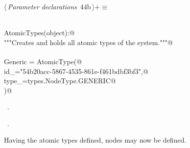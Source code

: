 \documentclass[
    a4paper,      %
    10pt,         %
    openright,    %
    notitlepage,  %
    parskip=half, %
]{scrreprt}       %
\theoremstyle{definition}                    %
\begin{document}
\begin{flushleft} \small
\begin{minipage}{\linewidth}\label{scrap56}\raggedright\small
{} $\langle\,${\itshape Parameter declarations}\nobreak\ {\footnotesize {44b}}$\,\rangle+\equiv$
\vspace{-1ex}
\begin{list}{}{} \item
\mbox{}\lstinline@@\\
\mbox{}\lstinline@class AtomicTypes(object):@\\
\mbox{}\lstinline@    """Creates and holds all atomic types of the system."""@\\
\mbox{}\lstinline@@\\
\mbox{}\lstinline@    Generic = AtomicType(@\\
\mbox{}\lstinline@        id_="54b20acc-5867-4535-861e-f461bdbf3bf3",@\\
\mbox{}\lstinline@        type_=types.NodeType.GENERIC@\\
\mbox{}\lstinline@    )@\\
\mbox{}\lstinline@@{\NWsep}
\end{list}
\vspace{-1.5ex}
\footnotesize
\begin{list}{}{\setlength{\itemsep}{-\parsep}\setlength{\itemindent}{-\leftmargin}}
\item \NWtxtMacroDefBy\ .
\item \NWtxtMacroRefIn\ .

\item{}
\end{list}
\end{minipage}\vspace{4ex}
\end{flushleft}
Having the atomic types defined, nodes may now be defined.
\end{document}
